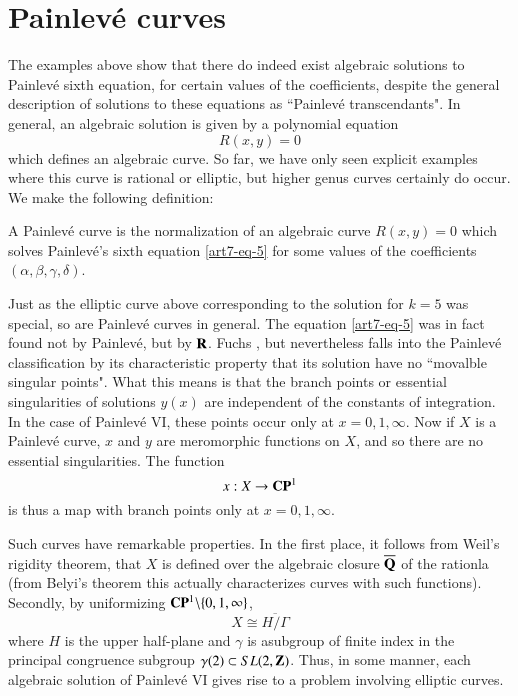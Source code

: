 \section{Painlev\'e curves}\label{art7-sec-7}
\pageoriginale

The examples above show that there do indeed exist algebraic solutions to Painlev\'e sixth equation, for certain values of the coefficients, despite the general description of solutions to these equations as ``Painlev\'e transcendants". In general, an algebraic solution is given by a polynomial equation
$$
R(x,y) = 0
$$
which defines an algebraic curve. So far, we have only seen explicit examples where this curve is rational or elliptic, but higher genus curves certainly do occur. We make the following definition:

\setcounter{defn}{1}
\begin{defn}\label{art7-definition-2}
A Painlev\'e curve is the normalization of an algebraic curve $R(x,y)=0$ which solves Painlev\'e's sixth equation
\eqref{art7-eq-5} for some values of the coefficients $(\alpha, \beta, \gamma, \delta)$.
\end{defn}
 Just as the elliptic curve above corresponding to the solution for $k=5$ was special, so are Painlev\'e curves in general. The equation \eqref{art7-eq-5} was in fact found not by Painlev\'e, but by $\mathbf{R}$. Fuchs \cite{art7-key4}, but nevertheless falls into the Painlev\'e classification by its characteristic property that its solution have no ``movalble singular points". What this means is that the branch points or essential singularities of solutions $y(x)$ are independent of the constants of integration. In the case of Painlev\'e VI, these points occur only at $x=0,1, \infty$. Now if $X$ is a Painlev\'e curve, $x$ and $y$ are meromorphic functions on $X$, and so there are no essential singularities. The function
 $$
 x : X\rightarrow \mathbf{C}\mathbf{P}^{1}
 $$
 is thus a map with branch points only at $x=0,1, \infty.$

 Such curves have remarkable properties. In the first place, it follows from Weil's rigidity theorem\cite{art7-key17}, that $X$ is defined over the algebraic closure $\overline{\mathbf{Q}}$ of the rationla (from Belyi's theorem \cite{art7-key2} this actually characterizes curves with such functions). Secondly, by uniformizing $\mathbf{C}\mathbf{P}^{1}\backslash\{0,1,\infty\}$,
$$
X\cong \overline{H/\Gamma}
$$
where $H$ is the upper half-plane and $\gamma$ is asubgroup of finite index in the principal congruence subgroup $\gamma(2) \subset SL(2,\mathbf{Z})$. Thus, in some manner, each algebraic solution of Painlev\'e VI gives rise to a problem involving elliptic curves.

